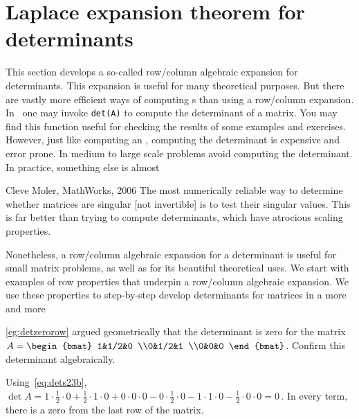 

\section{Laplace expansion theorem for determinants}
\label{sec:apd}


This section develops a so-called row\slash column algebraic expansion for determinants. 
This expansion is useful for many theoretical purposes.
But there are vastly more efficient ways of computing s than using a row\slash column expansion.  
In \script\ one may invoke \verb|det(A)| to compute the determinant of a matrix.
You may find this function useful for checking the results of some examples and exercises.
However, just like computing an , computing the determinant is expensive and error prone.  
In medium to large scale problems avoid computing the determinant.
In practice, something else is almost 

\begin{quoted}{Cleve Moler, MathWorks, 2006}
The most numerically reliable way to determine whether matrices are singular [not invertible] is to test their singular values. 
This is far better than trying to compute determinants, which have atrocious scaling properties.
\end{quoted}

Nonetheless, a row\slash column algebraic expansion for a determinant is useful for small matrix problems, as well as for its beautiful  theoretical uses.
We start with examples of row properties that underpin a row\slash column algebraic expansion.
We use these properties to step-by-step develop determinants for matrices in a more and more 





\begin{example} \label{eg:detzerorowii}
\cref{eg:detzerorow} argued geometrically that the determinant is zero for the matrix
\(A=\begin{bmat} 1&1/2&0
\\0&1/2&1 \\0&0&0 \end{bmat}\).
Confirm this determinant algebraically.
\begin{solution} 
Using~\eqref{eq:dets23b}, \(\det A
=1\cdot\frac12\cdot0+\frac12\cdot1\cdot0+0\cdot0\cdot0
-0\cdot\frac12\cdot0-1\cdot1\cdot0-\frac12\cdot0\cdot0
=0\)\,.  
In every term, there is a zero from the last row of the matrix.
\end{solution}
\end{example}


